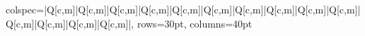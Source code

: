 \documentclass{standalone}
\begin{document}
    \pagestyle{empty}
        \small\renewcommand{\arraystretch}{10}
        \begin{tblr}{
            colspec={|Q[c,m]|Q[c,m]|Q[c,m]|Q[c,m]|Q[c,m]|Q[c,m]|Q[c,m]|Q[c,m]|Q[c,m]|Q[c,m]|Q[c,m]|Q[c,m]|Q[c,m]|Q[c,m]|},
            rows=30pt,
            columns=40pt
        }\hline
    \end{tblr}
\end{document}

